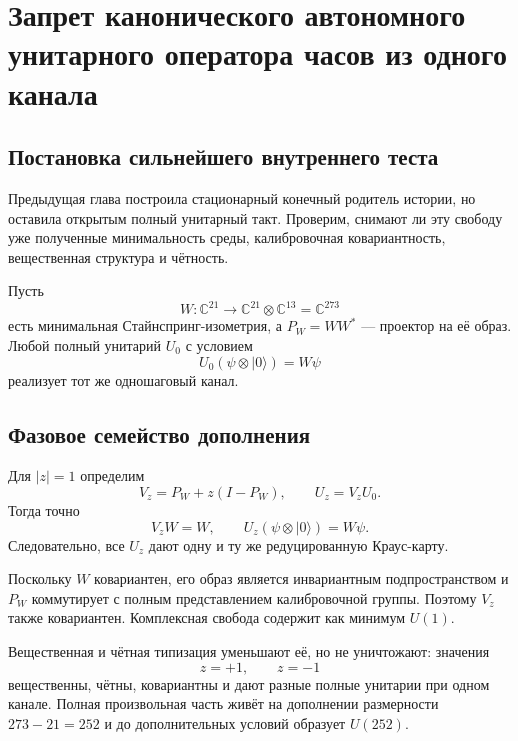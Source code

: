 \chapter{Запрет канонического автономного унитарного оператора часов из одного канала}
\label{ch:v8-canonical-autonomous-clock-unitary-extension-no-go-gate}

\section{Постановка сильнейшего внутреннего теста}

Предыдущая глава построила стационарный конечный родитель истории, но оставила
открытым полный унитарный такт. Проверим, снимают ли эту свободу уже
полученные минимальность среды, калибровочная ковариантность, вещественная структура и
чётность.

Пусть
\begin{equation}
 W:\mathbb C^{21}\longrightarrow\mathbb C^{21}\otimes\mathbb C^{13}
 =\mathbb C^{273}
\end{equation}
есть минимальная Стайнспринг-изометрия, а $P_W=WW^*$ --- проектор на её
образ. Любой полный унитарий $U_0$ с условием
\begin{equation}
 U_0(\psi\otimes|0\rangle)=W\psi
 \label{eq:v8-clock-unitary-extension-condition}
\end{equation}
реализует тот же одношаговый канал.

\section{Фазовое семейство дополнения}

Для $|z|=1$ определим
\begin{equation}
 V_z=P_W+z(I-P_W),
 \qquad U_z=V_zU_0.
 \label{eq:v8-clock-complement-phase-family}
\end{equation}
Тогда точно
\begin{equation}
 V_zW=W,
 \qquad
 U_z(\psi\otimes|0\rangle)=W\psi.
\end{equation}
Следовательно, все $U_z$ дают одну и ту же редуцированную Краус-карту.

Поскольку $W$ ковариантен, его образ является инвариантным подпространством и
$P_W$ коммутирует с полным представлением калибровочной группы. Поэтому $V_z$ также
ковариантен. Комплексная свобода содержит как минимум $U(1)$.

Вещественная и чётная типизация уменьшают её, но не уничтожают: значения
\begin{equation}
 z=+1,\qquad z=-1
\end{equation}
вещественны, чётны, ковариантны и дают разные полные унитарии при одном
канале. Полная произвольная часть живёт на дополнении размерности
$273-21=252$ и до дополнительных условий образует $U(252)$.

